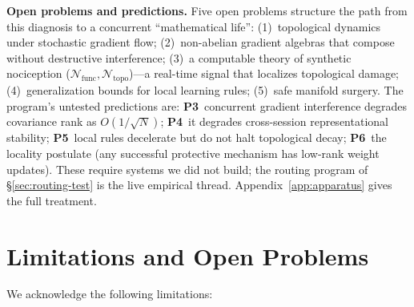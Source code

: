 \documentclass{article}
\begin{document}
\medskip
\noindent\textbf{Open problems and predictions.}\label{sec:program-predictions} Five open problems
structure the path from this diagnosis to a concurrent ``mathematical life'': (1)~topological
dynamics under stochastic gradient flow; (2)~non-abelian gradient algebras that compose without
destructive interference; (3)~a computable theory of synthetic nociception
($\mathcal{N}_{\text{func}},\mathcal{N}_{\text{topo}}$)---a real-time signal that localizes
topological damage; (4)~generalization bounds for local learning rules; (5)~safe manifold surgery.
The program's untested predictions are: \textbf{P3}~concurrent gradient interference degrades
covariance rank as $O(1/\sqrt{N})$; \textbf{P4}~it degrades cross-session representational stability;
\textbf{P5}~local rules decelerate but do not halt topological decay; \textbf{P6}~the locality
postulate (any successful protective mechanism has low-rank weight updates). These require systems we
did not build; the routing program of \S\ref{sec:routing-test} is the live empirical thread.
Appendix~\ref{app:apparatus} gives the full treatment.

\section{Limitations and Open Problems}
\label{sec:limitations}

We acknowledge the following limitations:
\end{document}
